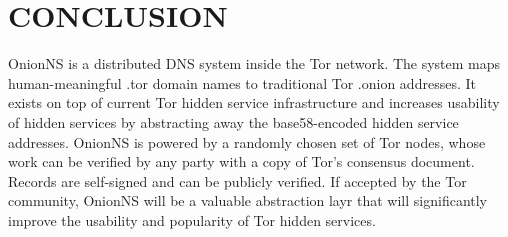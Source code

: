 
\chapter{CONCLUSION}

OnionNS is a distributed DNS system inside the Tor network. The system maps human-meaningful .tor domain names to traditional Tor .onion addresses. It exists on top of current Tor hidden service infrastructure and increases usability of hidden services by abstracting away the base58-encoded hidden service addresses. OnionNS is powered by a randomly chosen set of Tor nodes, whose work can be verified by any party with a copy of Tor's consensus document. Records are self-signed and can be publicly verified. If accepted by the Tor community, OnionNS will be a valuable abstraction layr that will significantly improve the usability and popularity of Tor hidden services.
